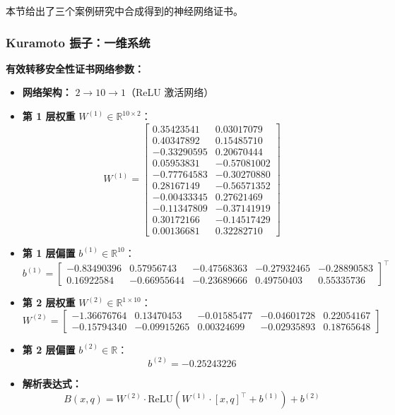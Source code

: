 本节给出了三个案例研究中合成得到的神经网络证书。

	\subsubsection{Kuramoto 振子：一维系统}
	\label{app:ko1d_neural}
	\textbf{有效转移安全性证书网络参数：}
	\begin{itemize}
	    \item \textbf{网络架构：} $2 \rightarrow 10 \rightarrow 1$（ReLU 激活网络）
	    \item \textbf{第 1 层权重} $W^{(1)} \in \mathbb{R}^{10 \times 2}$：
	    \[
	    W^{(1)} = \begin{bmatrix}
	     0.35423541 &  0.03017079 \\
	     0.40347892 &  0.15485710 \\
	    -0.33290595 &  0.20670444 \\
	     0.05953831 & -0.57081002 \\
	    -0.77764583 & -0.30270880 \\
	     0.28167149 & -0.56571352 \\
	    -0.00433345 &  0.27621469 \\
	    -0.11347809 & -0.37141919 \\
	     0.30172166 & -0.14517429 \\
	     0.00136681 &  0.32282710
	    \end{bmatrix}
	    \]
	    
	    \item \textbf{第 1 层偏置} $b^{(1)} \in \mathbb{R}^{10}$：
	    \[
	    b^{(1)} = \begin{bmatrix}
	    -0.83490396 &  0.57956743 & -0.47568363 & -0.27932465 & -0.28890583 \\
	     0.16922584 & -0.66955644 & -0.23689666 &  0.49750403 &  0.55335736
	    \end{bmatrix}^\top
	    \]
	    
	    \item \textbf{第 2 层权重} $W^{(2)} \in \mathbb{R}^{1 \times 10}$：
	    \[
	    W^{(2)} = \begin{bmatrix}
	    -1.36676764 &  0.13470453 & -0.01585477 & -0.04601728 &  0.22054167 \\
	    -0.15794340 & -0.09915265 &  0.00324699 & -0.02935893 &  0.18765648
	    \end{bmatrix}
	    \]
	    
	    \item \textbf{第 2 层偏置} $b^{(2)} \in \mathbb{R}$：
	    \[
	    b^{(2)} = -0.25243226
	    \]
	    
	    \item \textbf{解析表达式：}
	    \[
	    B(x, q) = W^{(2)} \cdot \text{ReLU}(W^{(1)} \cdot [x, q]^\top + b^{(1)}) + b^{(2)}
	    \]
	\end{itemize}

